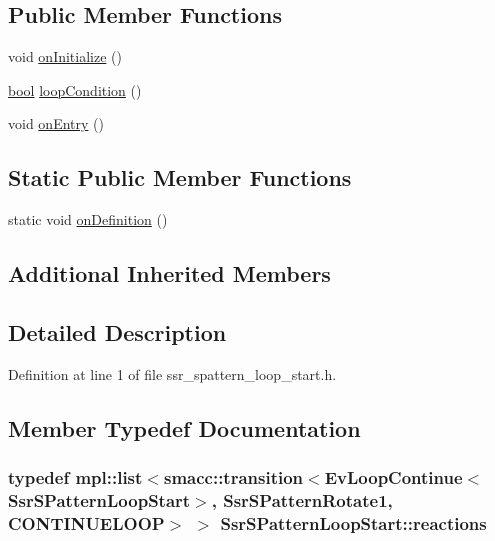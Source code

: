 \subsection*{Public Member Functions}
\begin{DoxyCompactItemize}
\item 
void \hyperlink{structSsrSPatternLoopStart_a3c8b8d7b67bf35e473807cd45a94f0af}{on\+Initialize} ()
\item 
\hyperlink{classbool}{bool} \hyperlink{structSsrSPatternLoopStart_a05752e48f87adc4e23ad6a34de48371e}{loop\+Condition} ()
\item 
void \hyperlink{structSsrSPatternLoopStart_a6ac24a860bb4375c0dc40639f865b8d6}{on\+Entry} ()
\end{DoxyCompactItemize}
\subsection*{Static Public Member Functions}
\begin{DoxyCompactItemize}
\item 
static void \hyperlink{structSsrSPatternLoopStart_a44da8abaf3b0a8cc4eace197d6a289ff}{on\+Definition} ()
\end{DoxyCompactItemize}
\subsection*{Additional Inherited Members}


\subsection{Detailed Description}


Definition at line 1 of file ssr\+\_\+spattern\+\_\+loop\+\_\+start.\+h.



\subsection{Member Typedef Documentation}
\subsubsection[{\texorpdfstring{reactions}{reactions}}]{\setlength{\rightskip}{0pt plus 5cm}typedef mpl\+::list$<${\bf smacc\+::transition}$<$Ev\+Loop\+Continue$<${\bf Ssr\+S\+Pattern\+Loop\+Start}$>$, {\bf Ssr\+S\+Pattern\+Rotate1}, C\+O\+N\+T\+I\+N\+U\+E\+L\+O\+OP$>$ $>$ {\bf Ssr\+S\+Pattern\+Loop\+Start\+::reactions}}\hypertarget{structSsrSPatternLoopStart_ac4859d7b58f82f99351f14a8ff7a26c3}{}\label{structSsrSPatternLoopStart_ac4859d7b58f82f99351f14a8ff7a26c3}


